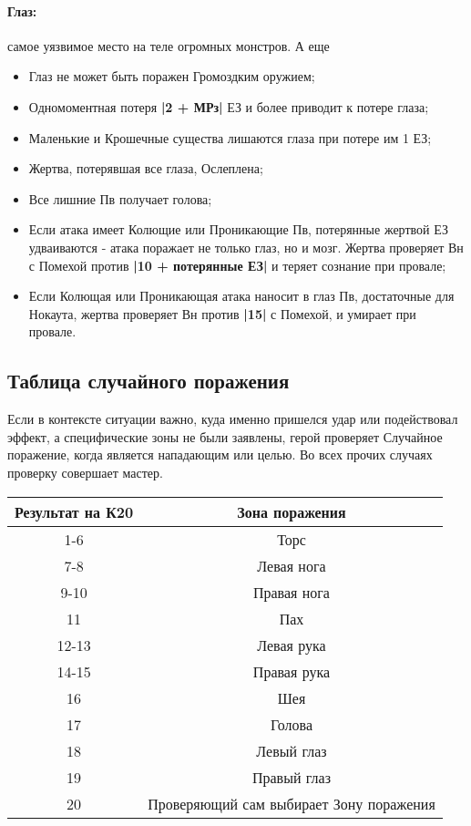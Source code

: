 \paragraph{Глаз:} самое уязвимое место на теле огромных монстров. А еще
\begin{itemize}
  \item Глаз не может быть поражен Громоздким оружием;
  \item Одномоментная потеря \textbf{|2 + МРз|} ЕЗ и более приводит к потере глаза;
  \item Маленькие и Крошечные существа лишаются глаза при потере им 1 ЕЗ;
  \item Жертва, потерявшая все глаза, Ослеплена;
  \item Все лишние Пв получает голова;
  \item Если атака имеет Колющие или Проникающие Пв, потерянные жертвой ЕЗ удваиваются - атака поражает не только глаз, но и мозг. Жертва проверяет Вн с Помехой против \textbf{|10 + потерянные ЕЗ|} и теряет сознание при провале;
  \item Если Колющая или Проникающая атака наносит в глаз Пв, достаточные для Нокаута, жертва проверяет Вн против \textbf{|15|} с Помехой, и умирает при провале.
\end{itemize}
\subsection{Таблица случайного поражения}
Если в контексте ситуации важно, куда именно пришелся удар или подействовал эффект, а специфические зоны не были заявлены, герой проверяет Случайное поражение, когда является нападающим или целью. Во всех прочих случаях проверку совершает мастер.
\begin{center} \begin{tabular}{|c|c|} \hline
  \textbf{Результат на К20} & \textbf{Зона поражения} \\ \hline
  1-6 & Торс \\ \hline
  7-8 & Левая нога \\ \hline
  9-10 & Правая нога \\ \hline
  11 & Пах \\ \hline
  12-13 & Левая рука \\ \hline
  14-15 & Правая рука \\ \hline
  16 & Шея \\ \hline
  17 & Голова \\ \hline
  18 & Левый глаз \\ \hline
  19 & Правый глаз \\ \hline
  20 & Проверяющий сам выбирает Зону поражения \\ \hline
\end{tabular} \end{center}
